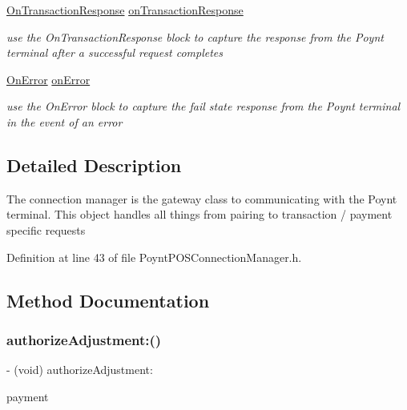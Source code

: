 \begin{DoxyCompactItemize}
\hyperlink{_poynt_p_o_s_connection_manager_8h_ae268209596a83d1d61f8ce4f2513d800}{On\+Transaction\+Response} \hyperlink{interface_poynt_p_o_s_connection_manager_aec722c6cb0f961265852a406242c430b}{on\+Transaction\+Response}
\begin{DoxyCompactList}\small\item\em use the On\+Transaction\+Response block to capture the response from the Poynt terminal after a successful request completes \end{DoxyCompactList}\item 
\hyperlink{_poynt_p_o_s_connection_manager_8h_aef7c4526c1bcdb84233ca3d7f7074d5a}{On\+Error} \hyperlink{interface_poynt_p_o_s_connection_manager_a2ea439a383295e69bc2094a614e3b6fb}{on\+Error}
\begin{DoxyCompactList}\small\item\em use the On\+Error block to capture the fail state response from the Poynt terminal in the event of an error \end{DoxyCompactList}\end{DoxyCompactItemize}


\subsection{Detailed Description}
The connection manager is the gateway class to communicating with the Poynt terminal.  This object handles all things from pairing to transaction / payment specific requests 

Definition at line 43 of file Poynt\+P\+O\+S\+Connection\+Manager.\+h.



\subsection{Method Documentation}
\hypertarget{interface_poynt_p_o_s_connection_manager_a5a35b99719ec02d91ec102d75a49bd7a}{}\label{interface_poynt_p_o_s_connection_manager_a5a35b99719ec02d91ec102d75a49bd7a} 
\subsubsection{\texorpdfstring{authorize\+Adjustment\+:()}{authorizeAdjustment:()}}
{\footnotesize\ttfamily -\/ (void) authorize\+Adjustment\+: \begin{DoxyParamCaption}\item[{(\hyperlink{interface_poynt_payment_object}{Poynt\+Payment\+Object} $\ast$)}]{payment }\end{DoxyParamCaption}}



